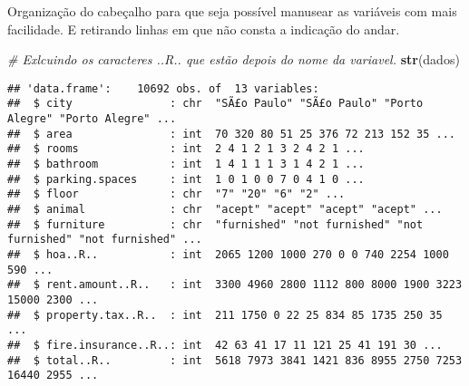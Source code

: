 \documentclass[
]{article}
\newenvironment{Shaded}{\begin{snugshade}}{\end{snugshade}}
\newcommand{\CommentTok}[1]{\textcolor[rgb]{0.56,0.35,0.01}{\textit{#1}}}
\newcommand{\KeywordTok}[1]{\textcolor[rgb]{0.13,0.29,0.53}{\textbf{#1}}}
\newcommand{\NormalTok}[1]{#1}
\newcommand{\OperatorTok}[1]{\textcolor[rgb]{0.81,0.36,0.00}{\textbf{#1}}}
\newcommand{\StringTok}[1]{\textcolor[rgb]{0.31,0.60,0.02}{#1}}
\begin{document}
Organização do cabeçalho para que seja possível manusear as variáveis
com mais facilidade. E retirando linhas em que não consta a indicação do
andar.

\begin{Shaded}
\begin{Highlighting}[]
\CommentTok{\# Exlcuindo os caracteres ..R.. que estão depois do nome da variavel.}
\KeywordTok{str}\NormalTok{(dados)}
\end{Highlighting}
\end{Shaded}

\begin{verbatim}
## 'data.frame':    10692 obs. of  13 variables:
##  $ city               : chr  "SÃ£o Paulo" "SÃ£o Paulo" "Porto Alegre" "Porto Alegre" ...
##  $ area               : int  70 320 80 51 25 376 72 213 152 35 ...
##  $ rooms              : int  2 4 1 2 1 3 2 4 2 1 ...
##  $ bathroom           : int  1 4 1 1 1 3 1 4 2 1 ...
##  $ parking.spaces     : int  1 0 1 0 0 7 0 4 1 0 ...
##  $ floor              : chr  "7" "20" "6" "2" ...
##  $ animal             : chr  "acept" "acept" "acept" "acept" ...
##  $ furniture          : chr  "furnished" "not furnished" "not furnished" "not furnished" ...
##  $ hoa..R..           : int  2065 1200 1000 270 0 0 740 2254 1000 590 ...
##  $ rent.amount..R..   : int  3300 4960 2800 1112 800 8000 1900 3223 15000 2300 ...
##  $ property.tax..R..  : int  211 1750 0 22 25 834 85 1735 250 35 ...
##  $ fire.insurance..R..: int  42 63 41 17 11 121 25 41 191 30 ...
##  $ total..R..         : int  5618 7973 3841 1421 836 8955 2750 7253 16440 2955 ...
\end{verbatim}

\begin{Shaded}
\end{Shaded}
\end{document}
